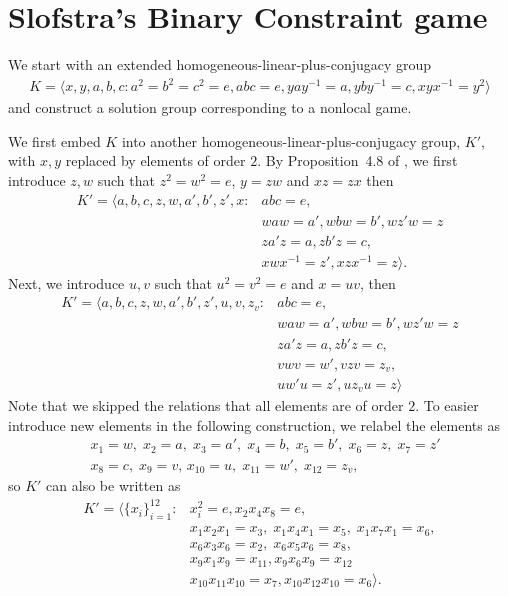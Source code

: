 \documentclass[11pt,letterpaper]{article}
\newcommand{\1}{\mathbb{1}}
\theoremstyle{definition}
\begin{document}



\appendix
\section{Slofstra's Binary Constraint game}
We start with an extended homogeneous-linear-plus-conjugacy group
\begin{align}
	K = \langle x,y,a,b,c: a^2=b^2=c^2=e, abc=e, yay^{-1} = a, yby^{-1}=c, xyx^{-1}=y^2\rangle
\end{align}
and construct a solution group corresponding to a nonlocal game.

We first embed $K$ into another homogeneous-linear-plus-conjugacy group, $K'$, 
with $x,y$ replaced by elements of order $2$. By Proposition~4.8 of \cite{slofstra2017},
we first introduce $z,w$ such that $z^2=w^2=e$, $y=zw$ and $xz=zx$ then
\begin{align}
	K' = \langle a,b,c,z,w,a',b',z',x: &abc = e,\\
	&waw=a', wbw=b', wz'w=z \\
	&za'z=a,zb'z=c,\\
	&xwx^{-1}=z', xzx^{-1} =z \rangle.
\end{align}
Next, we introduce $u,v$ such that $u^2=v^2=e$ and $x=uv$, then
\begin{align*}
	K' = \langle a,b,c,z,w,a',b',z',u,v,z_v: &abc = e, \\
	&waw=a', wbw=b', wz'w=z \\
	&za'z=a,zb'z=c,\\
	&vwv=w', vzv=z_v,\\
	&uw'u=z', uz_vu = z\rangle
\end{align*}
Note that we skipped the relations that all elements are of order $2$.
To easier introduce new elements in the following construction, we relabel the elements as
\begin{align*}
	&x_1 = w,\; x_2 = a,\; x_3 = a',\; x_4 =b, \;x_5 = b', \;x_6 = z, \;x_7 = z'\\
	&x_8 = c,\;x_9=v,\,x_{10} =u,\;x_{11} = w',\;x_{12} = z_v,
\end{align*}
so $K'$ can also be written as
\begin{equation}
\begin{split}
	K'=\langle \{x_i\}_{i=1}^{12}: &x_i^2 = e, x_2x_4x_8 = e,\\
	&x_1x_2x_1 =x_3, \;x_1x_4x_1 =x_5,\; x_1x_7x_1 =x_6,\\
	&x_6x_3x_6 =x_2, \;x_6x_5x_6 =x_8,\\
	&x_9x_1x_9 = x_{11},x_9x_6x_9 = x_{12}\\
	&x_{10}x_{11}x_{10} = x_7, x_{10}x_{12}x_{10} = x_6\rangle.
\end{split}
\end{equation}
\end{document}
